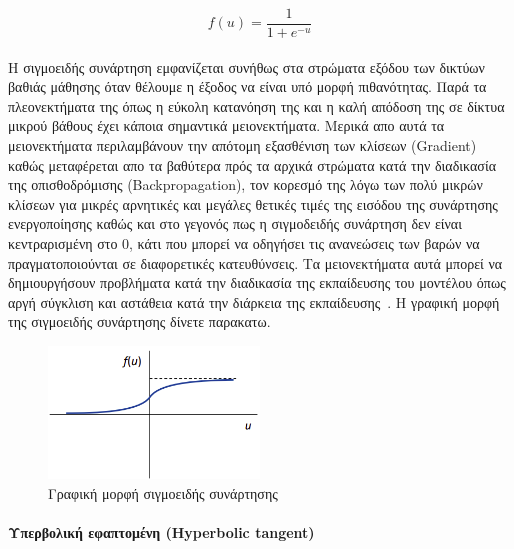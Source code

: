 \documentclass[12pt]{article}
\numberwithin{equation}{section}
\begin{document}
\begin{equation}
f(u) = \frac{1}{1 + e^{-u}}
\end{equation}  \\

Η σιγμοειδής συνάρτηση εμφανίζεται συνήθως στα στρώματα εξόδου των δικτύων βαθιάς μάθησης όταν θέλουμε η έξοδος να είναι υπό μορφή πιθανότητας. Παρά τα πλεονεκτήματα της όπως η εύκολη κατανόηση της και η καλή απόδοση της σε δίκτυα μικρού βάθους έχει κάποια σημαντικά μειονεκτήματα. Μερικά απο αυτά τα μειονεκτήματα περιλαμβάνουν την απότομη εξασθένιση των κλίσεων (Gradient) καθώς μεταφέρεται απο τα βαθύτερα πρός τα αρχικά στρώματα κατά την διαδικασία της οπισθοδρόμισης (Backpropagation), τον κορεσμό της λόγω των πολύ μικρών κλίσεων για μικρές αρνητικές και μεγάλες θετικές τιμές της εισόδου της συνάρτησης ενεργοποίησης καθώς και στο γεγονός πως η σιγμοδειδής συνάρτηση δεν είναι κεντραρισμένη στο 0, κάτι που μπορεί να οδηγήσει τις ανανεώσεις των βαρών να πραγματοποιούνται σε διαφορετικές κατευθύνσεις. Τα μειονεκτήματα αυτά μπορεί να δημιουργήσουν προβλήματα κατά την διαδικασία της εκπαίδευσης του μοντέλου όπως αργή σύγκλιση και αστάθεια κατά την διάρκεια της εκπαίδευσης~\cite{nwankpa2018activationfunctionscomparisontrends}. Η γραφική μορφή της σιγμοειδής συνάρτησης δίνετε παρακατω. \\

\begin{figure}[h!]
  \centering
  \includegraphics[width=0.5\textwidth]{images/Sigmoid.png} %
  \caption{Γραφική μορφή σιγμοειδής συνάρτησης}
  \label{figure 12}
\end{figure}

\paragraph{Υπερβολική εφαπτομένη (Hyperbolic tangent)\\[0.5cm]}
\end{document}
